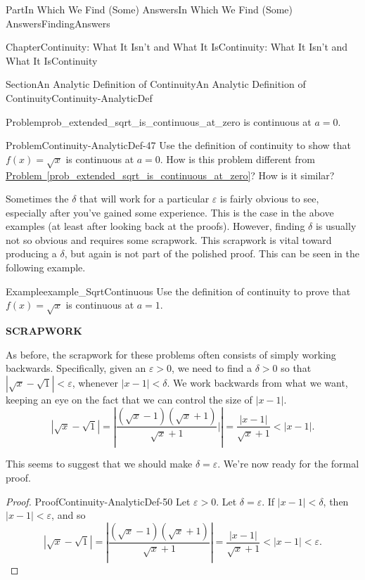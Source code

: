 \documentclass[oneside,10pt,]{book}
\newcommand{\xreffont}{\relax}
\newcommand{\terminology}[1]{\textbf{#1}}
\numberwithin{equation}{part}
\newcommand{\abs}[1]{\left|#1\right|}
\newcommand{\eps}{\varepsilon}
\newcommand{\lt}{<}
\begin{document}
\begin{partptx}{Part}{In Which We Find (Some) Answers}{}{In Which We Find (Some) Answers}{}{}{FindingAnswers}
\begin{chapterptx}{Chapter}{Continuity: What It Isn't and What It Is}{}{Continuity: What It Isn't and What It Is}{}{}{Continuity}
\begin{sectionptx}{Section}{An Analytic Definition of Continuity}{}{An Analytic Definition of Continuity}{}{}{Continuity-AnalyticDef}
\begin{problem}{Problem}{}{prob_extended_sqrt_is_continuous_at_zero}
is continuous at \(a=0\).%
\end{problem}
\begin{problem}{Problem}{}{Continuity-AnalyticDef-47}%
 Use the definition of continuity to show that \(f(x)=
\sqrt{x}\) is continuous at \(a=0\).  How is this problem different from \hyperref[prob_extended_sqrt_is_continuous_at_zero]{Problem~{\xreffont\ref{prob_extended_sqrt_is_continuous_at_zero}}}? How is it similar?%
\end{problem}
Sometimes the \(\delta\) that will work for a particular \(\eps\) is fairly obvious to see, especially after you've gained some experience.  This is the case in the above examples (at least after looking back at the proofs).  However, finding \(\delta\) is usually not so obvious and requires some scrapwork.  This scrapwork is vital toward producing a \(\delta\), but again is not part of the polished proof. This can be seen in the following example.%
\begin{example}{Example}{}{example_SqrtContinuous}%
Use the definition of continuity to prove that \(f(x)=\sqrt{x}\) is continuous at \(a=1\).%
\par
\terminology{SCRAPWORK}%
\par
As before, the scrapwork for these problems often consists of simply working backwards.  Specifically, given an \(\eps>0\), we need to find a \(\delta>0\) so that \(\abs{\sqrt{x}-\sqrt{1}}\lt \eps\), whenever \(\abs{x-1}\lt
\delta\).  We work backwards from what we want, keeping an eye on the fact that we can control the size of \(\abs{x-1}\).%
\begin{equation*}
\abs{\sqrt{x}-\sqrt{1}}=\abs{\frac{\left(\sqrt{x}-1\right)\left(\sqrt{x}+1\right)}{\sqrt{x}+1}|}=\frac{\abs{x-1}}{\sqrt{x}+1}\lt
\abs{x-1}\text{.}
\end{equation*}
%
\par
This seems to suggest that we should make \(\delta=\eps\). We're now ready for the formal proof.%
\end{example}
\begin{proof}{Proof}{}{Continuity-AnalyticDef-50}
Let \(\eps>0\). Let \(\delta=\eps\). If \(\abs{x-1}\lt \delta\), then \(\abs{x-1}\lt \eps\), and so%
\begin{equation*}
\abs{\sqrt{x}-\sqrt{1}}=\abs{\frac{\left(\sqrt{x}-1\right)\left(\sqrt{x}+1\right)}{ \sqrt{x}+1}}=\frac{\abs{x-1}}{\sqrt{x}+1}\lt \abs{x-1}\lt \eps\text{.}
\end{equation*}
%
\par

\end{proof}
\end{sectionptx}
\end{chapterptx}
\end{partptx}
\end{document}
